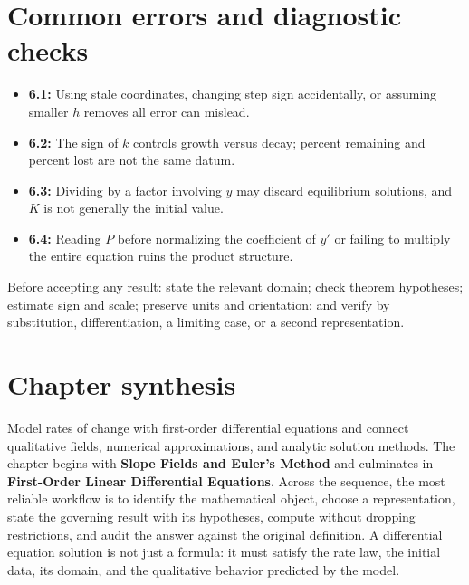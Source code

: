 \documentclass[11pt]{article}
\begin{document}
\section{Common errors and diagnostic checks}
\begin{warningbox}
\begin{itemize}
\item \textbf{6.1:} Using stale coordinates, changing step sign accidentally, or assuming smaller $h$ removes all error can mislead.
\item \textbf{6.2:} The sign of $k$ controls growth versus decay; percent remaining and percent lost are not the same datum.
\item \textbf{6.3:} Dividing by a factor involving $y$ may discard equilibrium solutions, and $K$ is not generally the initial value.
\item \textbf{6.4:} Reading $P$ before normalizing the coefficient of $y'$ or failing to multiply the entire equation ruins the product structure.
\end{itemize}
\end{warningbox}
\begin{checkbox}
Before accepting any result: state the relevant domain; check theorem hypotheses; estimate sign and scale; preserve units and orientation; and verify by substitution, differentiation, a limiting case, or a second representation.
\end{checkbox}

\section{Chapter synthesis}
Model rates of change with first-order differential equations and connect qualitative fields, numerical approximations, and analytic solution methods. The chapter begins with \textbf{Slope Fields and Euler's Method} and culminates in \textbf{First-Order Linear Differential Equations}. Across the sequence, the most reliable workflow is to identify the mathematical object, choose a representation, state the governing result with its hypotheses, compute without dropping restrictions, and audit the answer against the original definition. A differential equation solution is not just a formula: it must satisfy the rate law, the initial data, its domain, and the qualitative behavior predicted by the model.
\end{document}
